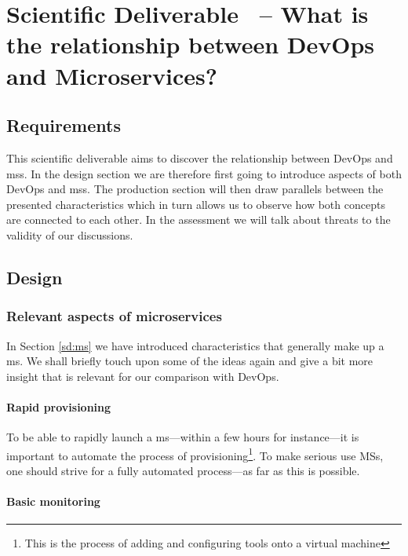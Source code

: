 \section{Scientific Deliverable \thesdel\ -- What is the relationship between DevOps and Microservices?}
\label{sd:devops}


\subsection{Requirements}

This scientific deliverable aims to discover the relationship between
DevOps and \glspl{ms}. In the design section we are
therefore first going to introduce aspects of both DevOps and
\glspl{ms}. The production section will then draw parallels between
the presented characteristics which in turn allows us to observe how
both concepts are connected to each other. In the assessment we will
talk about threats to the validity of our discussions.

\subsection{Design}

\subsubsection{Relevant aspects of microservices}

In Section \ref{sd:ms} we have introduced characteristics that
generally make up a \gls{ms}. We shall briefly touch upon some of the
ideas again and give a bit more insight that is relevant for our
comparison with DevOps.

\paragraph{Rapid provisioning}

To be able to rapidly launch a \gls{ms}---within a few hours for
instance---it is important to automate the process of
provisioning\footnote{This is the process of adding and configuring
tools onto a virtual machine}. To make serious use MSs, one should
strive for a fully automated process---as far as this is possible.
\cite{ms-prereq}

\paragraph{Basic monitoring}

